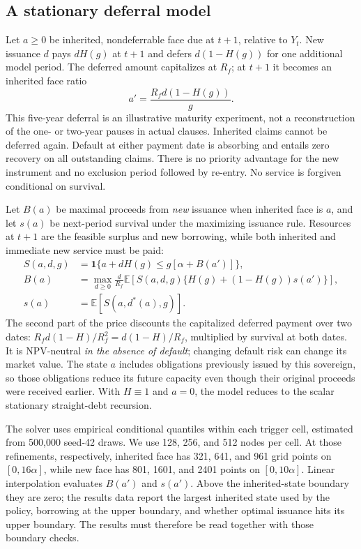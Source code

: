 \documentclass[11pt]{article}
\newcommand{\E}{\mathbb E}
\newcommand{\ind}{\mathbf 1}
\begin{document}
\subsection{A stationary deferral model}
Let $a\ge0$ be inherited, nondeferrable face due at $t+1$, relative to $Y_t$. New issuance $d$ pays $dH(g)$ at $t+1$ and defers $d(1-H(g))$ for one additional model period. The deferred amount capitalizes at $R_f$; at $t+1$ it becomes an inherited face ratio
\begin{equation}\label{eq:arrears}
 a'=\frac{R_fd(1-H(g))}{g}.
\end{equation}
This five-year deferral is an illustrative maturity experiment, not a reconstruction of the one- or two-year pauses in actual clauses. Inherited claims cannot be deferred again. Default at either payment date is absorbing and entails zero recovery on all outstanding claims. There is no priority advantage for the new instrument and no exclusion period followed by re-entry. No service is forgiven conditional on survival.

Let $B(a)$ be maximal proceeds from \emph{new} issuance when inherited face is $a$, and let $s(a)$ be next-period survival under the maximizing issuance rule. Resources at $t+1$ are the feasible surplus and new borrowing, while both inherited and immediate new service must be paid:
\begin{align}
 S(a,d,g)&=\ind\{a+dH(g)\le g[\alpha+B(a')]\},\label{eq:def_survival}\\
 B(a)&=\max_{d\ge0}\frac{d}{R_f}\E\!\left[S(a,d,g)\{H(g)+(1-H(g))s(a')\}\right],\label{eq:def_bellman}\\
 s(a)&=\E[S(a,d^*(a),g)].\label{eq:def_s}
\end{align}
The second part of the price discounts the capitalized deferred payment over two dates: $R_fd(1-H)/R_f^2=d(1-H)/R_f$, multiplied by survival at both dates. It is NPV-neutral \emph{in the absence of default}; changing default risk can change its market value. The state $a$ includes obligations previously issued by this sovereign, so those obligations reduce its future capacity even though their original proceeds were received earlier. With $H\equiv1$ and $a=0$, the model reduces to the scalar stationary straight-debt recursion.

The solver uses empirical conditional quantiles within each trigger cell, estimated from 500,000 seed-42 draws. We use 128, 256, and 512 nodes per cell. At those refinements, respectively, inherited face has 321, 641, and 961 grid points on $[0,16\alpha]$, while new face has 801, 1601, and 2401 points on $[0,10\alpha]$. Linear interpolation evaluates $B(a')$ and $s(a')$. Above the inherited-state boundary they are zero; the results data report the largest inherited state used by the policy, borrowing at the upper boundary, and whether optimal issuance hits its upper boundary. The results must therefore be read together with those boundary checks.
\end{document}
